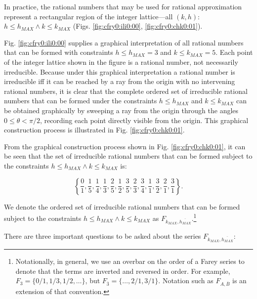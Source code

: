 In practice, the rational numbers that may be used for rational
approximation represent a rectangular region of the integer
lattice---all $(k,h):$ $h \leq h_{MAX} \wedge k \leq k_{MAX}$ 
(Figs. \ref{fig:cfry0:ili0:00}, \ref{fig:cfry0:chk0:01}).

Fig. \ref{fig:cfry0:ili0:00} supplies a graphical
interpretation of all rational numbers
that can be formed with constraints $h \leq h_{MAX} = 3$ 
and $k \leq k_{MAX} = 5$.  Each point of the integer lattice
shown in the figure is a rational number, not necessarily 
irreducible.  Because under this graphical interpretation
a rational number is irreducible iff it can be reached
by a ray from the origin with no intervening rational numbers,
it is clear that the complete ordered set of irreducible
rational numbers that can be formed under the
constraints $h \leq h_{MAX}$ and $k \leq k_{MAX}$
can be obtained graphically by sweeping a ray from
the origin through the angles $0 \leq \theta < \pi/2$,
recording each point directly visible from the origin.
This graphical construction process is illustrated
in Fig. \ref{fig:cfry0:chk0:01}.

From the graphical construction process shown in 
Fig. \ref{fig:cfry0:chk0:01}, it can be seen that the 
set of irreducible rational numbers that can be formed
subject to the constraints 
$h \leq h_{MAX} \wedge k \leq k_{MAX}$ is:

\begin{equation}
\left\{ { \frac{0}{1}, \frac{1}{5}, \frac{1}{4},
          \frac{1}{3}, \frac{2}{5}, \frac{1}{2},
          \frac{3}{5},
          \frac{2}{3}, \frac{3}{4}, \frac{1}{1},
          \frac{3}{2}, \frac{2}{1}, \frac{3}{1} } \right\} .
\end{equation}

We denote the ordered set of irreducible rational 
numbers that can be formed subject to the
constraints $h \leq h_{MAX} \wedge k \leq k_{MAX}$ as
$F_{k_{MAX}, \overline{h_{MAX}}}$.\footnote{Notationally,
in general,
we use an overbar on the order of a Farey series to
denote that the terms are inverted and reversed in order.
For example, $F_3 = \{ 0/1, 1/3, 1/2, \ldots \}$, but
$F_{\overline{3}}  = \{ \ldots , 2/1, 3/1 \}$.  Notation
such as $F_{A, \overline{B}}$ is an extension of that convention.}

There are three important questions to be asked about
the series $F_{k_{MAX}, \overline{h_{MAX}}}$:

